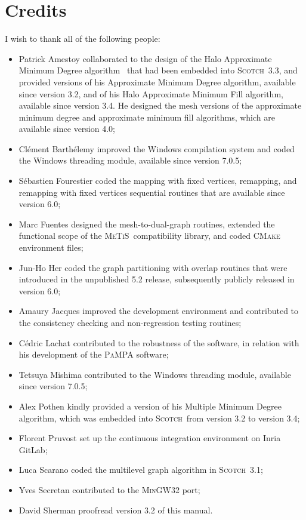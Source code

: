 \documentclass{article}
\newcommand{\scotch}{\textsc{Scotch}}               %
\newcommand{\metis}{\mbox{\textsc{Me$\!$T$\!$iS}}}  %
\begin{document}

\section*{Credits}

I wish to thank all of the following people:
\begin{itemize}
\item
Patrick Amestoy collaborated to the design of the Halo Approximate
Minimum Degree algorithm~\cite{peroam99} that had been embedded into
\scotch\ \textsc{3.3}, and provided versions of his Approximate Minimum
Degree algorithm, available since version \textsc{3.2}, and of his
Halo Approximate Minimum Fill algorithm, available since version
\textsc{3.4}. He designed the mesh versions of the approximate
minimum degree and approximate minimum fill algorithms, which are
available since version \textsc{4.0};
\item
Clément Barthélemy improved the Windows compilation system and coded
the Windows threading module, available since version \textsc{7.0.5};
\item
S\'ebastien Fourestier coded the mapping with fixed vertices,
remapping, and remapping with fixed vertices sequential routines that
are available since version \textsc{6.0};
\item
Marc Fuentes designed the mesh-to-dual-graph routines, extended the
functional scope of the \metis\ compatibility library, and coded
\textsc{CMake} environment files;
\item
Jun-Ho Her coded the graph partitioning with overlap routines that
were introduced in the unpublished \textsc{5.2} release, subsequently
publicly released in version \textsc{6.0};
\item
Amaury Jacques improved the development environment and contributed to
the consistency checking and non-regression testing routines;
\item
C\'edric Lachat contributed to the robustness of the software, in
relation with his development of the \textsc{PaMPA} software;
\item
Tetsuya Mishima contributed to the Windows threading module, available
since version \textsc{7.0.5};
\item
Alex Pothen kindly provided a version of his Multiple Minimum Degree
algorithm, which was embedded into \scotch\ from version \textsc{3.2} to
version \textsc{3.4};
\item
Florent Pruvost set up the continuous integration environment on
Inria GitLab;
\item
Luca Scarano coded the multilevel graph algorithm in
\scotch\ \textsc{3.1};
\item
Yves Secretan contributed to the \textsc{MinGW32} port;
\item
David Sherman proofread version \textsc{3.2} of this manual.
\end{itemize}




\end{document}
